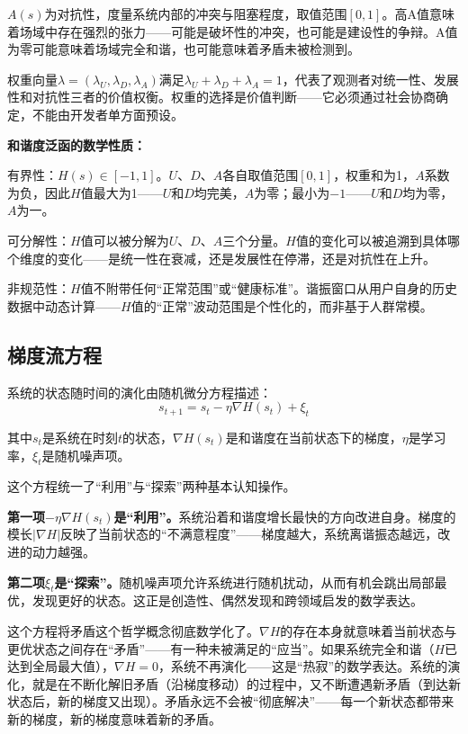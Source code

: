 \documentclass[11pt,a4paper]{book}
\theoremstyle{definition}
\begin{document}
$A(s)$为对抗性，度量系统内部的冲突与阻塞程度，取值范围$[0, 1]$。高A值意味着场域中存在强烈的张力——可能是破坏性的冲突，也可能是建设性的争辩。A值为零可能意味着场域完全和谐，也可能意味着矛盾未被检测到。

权重向量$\lambda=(\lambda_U, \lambda_D, \lambda_A)$满足$\lambda_U + \lambda_D + \lambda_A = 1$，代表了观测者对统一性、发展性和对抗性三者的价值权衡。权重的选择是价值判断——它必须通过社会协商确定，不能由开发者单方面预设。

\textbf{和谐度泛函的数学性质：}

有界性：$H(s) \in [-1, 1]$。$U$、$D$、$A$各自取值范围$[0, 1]$，权重和为1，$A$系数为负，因此$H$值最大为1——$U$和$D$均完美，$A$为零；最小为$-1$——$U$和$D$均为零，$A$为一。

可分解性：$H$值可以被分解为$U$、$D$、$A$三个分量。$H$值的变化可以被追溯到具体哪个维度的变化——是统一性在衰减，还是发展性在停滞，还是对抗性在上升。

非规范性：$H$值不附带任何“正常范围”或“健康标准”。谐振窗口从用户自身的历史数据中动态计算——$H$值的“正常”波动范围是个性化的，而非基于人群常模。

\subsection{梯度流方程}

系统的状态随时间的演化由随机微分方程描述：
\begin{equation}
s_{t+1} = s_t - \eta \nabla H(s_t) + \xi_t
\end{equation}

其中$s_t$是系统在时刻$t$的状态，$\nabla H(s_t)$是和谐度在当前状态下的梯度，$\eta$是学习率，$\xi_t$是随机噪声项。

这个方程统一了“利用”与“探索”两种基本认知操作。

\textbf{第一项$-\eta\nabla H(s_t)$是“利用”。}系统沿着和谐度增长最快的方向改进自身。梯度的模长$|\nabla H|$反映了当前状态的“不满意程度”——梯度越大，系统离谐振态越远，改进的动力越强。

\textbf{第二项$\xi_t$是“探索”。}随机噪声项允许系统进行随机扰动，从而有机会跳出局部最优，发现更好的状态。这正是创造性、偶然发现和跨领域启发的数学表达。

这个方程将矛盾这个哲学概念彻底数学化了。$\nabla H$的存在本身就意味着当前状态与更优状态之间存在“矛盾”——有一种未被满足的“应当”。如果系统完全和谐（$H$已达到全局最大值），$\nabla H = 0$，系统不再演化——这是“热寂”的数学表达。系统的演化，就是在不断化解旧矛盾（沿梯度移动）的过程中，又不断遭遇新矛盾（到达新状态后，新的梯度又出现）。矛盾永远不会被“彻底解决”——每一个新状态都带来新的梯度，新的梯度意味着新的矛盾。
\end{document}
